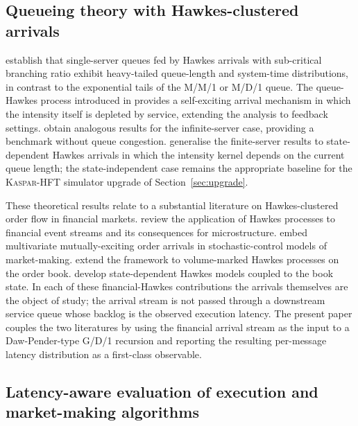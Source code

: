 \documentclass[11pt]{article}
\newcommand{\kasparhft}{\textsc{Kaspar-HFT}}
\begin{document}
\subsection{Queueing theory with Hawkes-clustered arrivals}
\label{sec:related-queueing}

\citet{dawpender2018queues} establish that single-server queues fed by Hawkes arrivals with sub-critical branching ratio exhibit heavy-tailed queue-length and system-time distributions, in contrast to the exponential tails of the M/M/1 or M/D/1 queue. The queue-Hawkes process introduced in \citet{dawpender2018queuehawkes} provides a self-exciting arrival mechanism in which the intensity itself is depleted by service, extending the analysis to feedback settings. \citet{koopsboxmamandjes2018} obtain analogous results for the infinite-server case, providing a benchmark without queue congestion. \citet{gaozhu2024statedep} generalise the finite-server results to state-dependent Hawkes arrivals in which the intensity kernel depends on the current queue length; the state-independent case remains the appropriate baseline for the \kasparhft{} simulator upgrade of Section~\ref{sec:upgrade}.

These theoretical results relate to a substantial literature on Hawkes-clustered order flow in financial markets. \citet{bacry2015review} review the application of Hawkes processes to financial event streams and its consequences for microstructure. \citet{carteajaimungalricci2014} embed multivariate mutually-exciting order arrivals in stochastic-control models of market-making. \citet{rambaldi2017volume} extend the framework to volume-marked Hawkes processes on the order book. \citet{bacrygaiffasmuzy2015} develop state-dependent Hawkes models coupled to the book state. In each of these financial-Hawkes contributions the arrivals themselves are the object of study; the arrival stream is not passed through a downstream service queue whose backlog is the observed execution latency. The present paper couples the two literatures by using the financial arrival stream as the input to a Daw-Pender-type G/D/1 recursion and reporting the resulting per-message latency distribution as a first-class observable.

\subsection{Latency-aware evaluation of execution and market-making algorithms}
\label{sec:related-eval}
\end{document}

